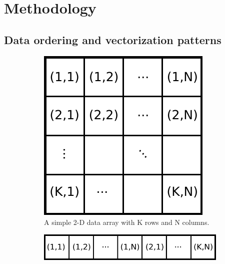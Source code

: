 \documentclass[12pt,number,sort&compress,preprint]{elsarticle}
\begin{document}
\section{Methodology}
\subsection{Data ordering and vectorization patterns}
\label{S:data}

\begin{figure}[htb]
  \centering
  \begin{minipage}{0.45\linewidth}
    \begin{subfigure}[t]{\textwidth}
      \includegraphics[width=\textwidth]{data_layouts.pdf}
      \caption{A simple 2-D data array with K rows and N columns.}
      \label{F:mem}
    \end{subfigure}
  \end{minipage}
  \hfil
  \begin{minipage}{0.45\linewidth}
    \begin{subfigure}[t]{\textwidth}
	\includegraphics[width=\textwidth]{row_major.pdf}

\end{subfigure}
\end{minipage}
\end{figure}
\end{document}

